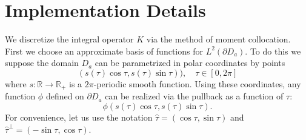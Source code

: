 \documentclass[11pt]{amsart}
\theoremstyle{definition}
\theoremstyle{definition}
\theoremstyle{definition}
\begin{document}
\section{Implementation Details}
We discretize the integral operator $K$ via the method of moment collocation. First we choose an approximate basis of functions for $L^{2}(\partial D_{a})$. To do this we suppose the domain $D_{a}$ can be parametrized in polar coordinates by points
\begin{equation*}
(s(\tau)\cos{\tau}, s(\tau)\sin{\tau})), \quad \tau \in [0,2\pi]
\end{equation*}
where $s:\mathbb{R} \to \mathbb{R}_{+}$ is a $2\pi$-periodic smooth function. Using these coordinates, any function $\phi$ defined on $\partial D_{a}$ can be realized via the pullback as a function of $\tau$:
\begin{equation*}
\phi(s(\tau)\cos{\tau}, s(\tau)\sin{\tau}).
\end{equation*}
For convenience, let us use the notation $\widehat{\tau} = (\cos{\tau},\sin{\tau})$ and $\widehat{\tau}^{\perp} = (-\sin{\tau}, \cos{\tau})$.
\end{document}
